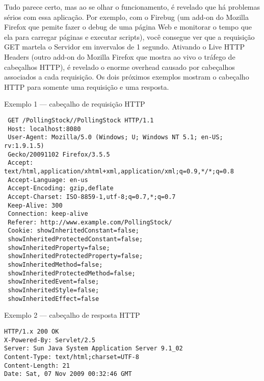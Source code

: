 \documentclass[a4paper,12pt]{article}
\begin{document}
Tudo parece certo, mas ao se olhar o funcionamento, é revelado que há problemas sérios com essa aplicação. Por exemplo, com o Firebug (um add-on do Mozilla Firefox que pemite fazer o debug de uma página Web e monitorar o tempo que ela para carregar páginas e executar scripts), você consegue ver que a requisição GET martela o Servidor em invervalos de 1 segundo. Ativando o Live HTTP Headers (outro add-on do Mozilla Firefox que mostra ao vivo o tráfego de cabeçalhos HTTP), é revelado o enorme overhead causado por cabeçalhos associados a cada requisição. Os dois próximos exemplos mostram o cabeçalho HTTP para somente uma requisição e uma resposta.

Exemplo 1 — cabeçalho de requisição HTTP
\begin{small}
\begin{verbatim}
 GET /PollingStock//PollingStock HTTP/1.1
 Host: localhost:8080
 User-Agent: Mozilla/5.0 (Windows; U; Windows NT 5.1; en-US; rv:1.9.1.5)
 Gecko/20091102 Firefox/3.5.5
 Accept: text/html,application/xhtml+xml,application/xml;q=0.9,*/*;q=0.8
 Accept-Language: en-us
 Accept-Encoding: gzip,deflate
 Accept-Charset: ISO-8859-1,utf-8;q=0.7,*;q=0.7
 Keep-Alive: 300
 Connection: keep-alive
 Referer: http://www.example.com/PollingStock/
 Cookie: showInheritedConstant=false;
 showInheritedProtectedConstant=false;
 showInheritedProperty=false;
 showInheritedProtectedProperty=false;
 showInheritedMethod=false;
 showInheritedProtectedMethod=false;
 showInheritedEvent=false;
 showInheritedStyle=false;
 showInheritedEffect=false
\end{verbatim}
\end{small}

Exemplo 2 — cabeçalho de resposta HTTP
\begin{small}
\begin{verbatim}
HTTP/1.x 200 OK
X-Powered-By: Servlet/2.5
Server: Sun Java System Application Server 9.1_02
Content-Type: text/html;charset=UTF-8
Content-Length: 21
Date: Sat, 07 Nov 2009 00:32:46 GMT
\end{verbatim}
\end{small}
\end{document}
